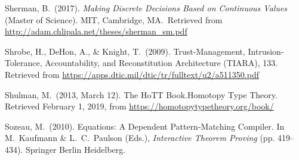 \documentclass[12pt,twoside]{article}
\begin{document}
{\begin{thebibliography}{222}
\mdbibitemlabel{}Sherman, B.~(2017). \emph{Making Discrete Decisions Based on Continuous Values} (Master of Science). MIT, Cambridge, MA.~Retrieved from \href{http://adam.chlipala.net/theses/sherman_sm.pdf}{{\ttfamily http://\hspace{0pt}adam.\hspace{0pt}chlipala.\hspace{0pt}net/\hspace{0pt}theses/\hspace{0pt}sherman\_\hspace{0pt}sm.\hspace{0pt}pdf}}\label{sherman_making_2017}%

\mdbibitemlabel{}Shrobe, H., DeHon, A., \& Knight, T.~(2009). Trust-Management, Intrusion-Tolerance, Accountability, and Reconstitution Architecture (TIARA), 133. Retrieved from \href{https://apps.dtic.mil/dtic/tr/fulltext/u2/a511350.pdf}{{\ttfamily https://\hspace{0pt}apps.\hspace{0pt}dtic.\hspace{0pt}mil/\hspace{0pt}dtic/\hspace{0pt}tr/\hspace{0pt}fulltext/\hspace{0pt}u2/\hspace{0pt}a511350.\hspace{0pt}pdf}}\label{shrobe_trust-management_2009}%

\mdbibitemlabel{}Shulman, M.~(2013, March 12). The HoTT Book.Homotopy Type Theory. Retrieved February 1, 2019, from \href{https://homotopytypetheory.org/book/}{{\ttfamily https://\hspace{0pt}homotopytypetheory.\hspace{0pt}org/\hspace{0pt}book/\hspace{0pt}}}\label{shulman_hott_2013}%

\mdbibitemlabel{}Sozeau, M.~(2010). Equations: A Dependent Pattern-Matching Compiler. In M.~Kaufmann \& L.~C.~Paulson (Eds.), \emph{Interactive Theorem Proving} (pp. 419–434). Springer Berlin Heidelberg.\label{sozeau_equations:_2010}%


\end{thebibliography}}
\end{document}
